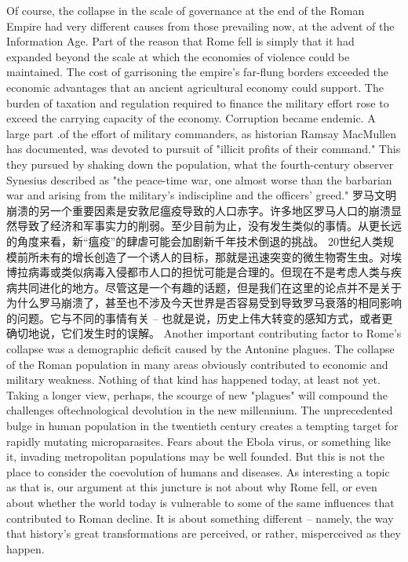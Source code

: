 \begin{paracol}{2}
  \switchcolumn
  Of course, the collapse in the scale of governance at the end of the Roman Empire had very different causes from those prevailing now, at the advent of the Information Age. Part of the reason that Rome fell is simply that it had expanded beyond the scale at which the economies of violence could be maintained. The cost of garrisoning the empire's far-flung borders exceeded the economic advantages that an ancient agricultural economy could support. The burden of taxation and regulation required to finance the military effort rose to exceed the carrying capacity of the economy. Corruption became endemic. A large part .of the effort of military commanders, as historian Ramsay MacMullen has documented, was devoted to pursuit of "illicit profits of their command." This they pursued by shaking down the population, what the fourth-century observer Synesius described as "the peace-time war, one almost worse than the barbarian war and arising from the military's indiscipline and the officers' greed."  
  \switchcolumn*
  罗马文明崩溃的另一个重要因素是安敦尼瘟疫导致的人口赤字。许多地区罗马人口的崩溃显然导致了经济和军事实力的削弱。至少目前为止，没有发生类似的事情。从更长远的角度来看，新“瘟疫”的肆虐可能会加剧新千年技术倒退的挑战。 20世纪人类规模前所未有的增长创造了一个诱人的目标，那就是迅速突变的微生物寄生虫。对埃博拉病毒或类似病毒入侵都市人口的担忧可能是合理的。但现在不是考虑人类与疾病共同进化的地方。尽管这是一个有趣的话题，但是我们在这里的论点并不是关于为什么罗马崩溃了，甚至也不涉及今天世界是否容易受到导致罗马衰落的相同影响的问题。它与不同的事情有关 -- 也就是说，历史上伟大转变的感知方式，或者更确切地说，它们发生时的误解。
  \switchcolumn
  Another important contributing factor to Rome's collapse was a demographic deficit caused by the Antonine plagues. The collapse of the Roman population in many areas obviously contributed to economic and military weakness. Nothing of that kind has happened today, at least not yet. Taking a longer view, perhaps, the scourge of new "plagues" will compound the challenges oftechnological devolution in the new millennium. The unprecedented bulge in human population in the twentieth century creates a tempting target for rapidly mutating microparasites. Fears about the Ebola virus, or something like it, invading metropolitan populations may be well founded. But this is not the place to consider the coevolution of humans and diseases. As interesting a topic as that is, our argument at this juncture is not about why Rome fell, or even about whether the world today is vulnerable to some of the same influences that contributed to Roman decline. It is about something different -- namely, the way that history's great transformations are perceived, or rather, misperceived as they happen.


\end{paracol}
